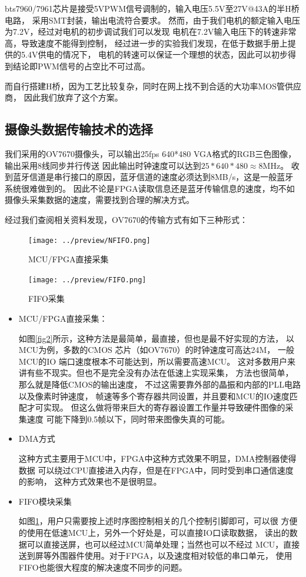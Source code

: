 \documentclass[a4paper]{paper}
\begin{document}
bts7960/7961芯片是接受5VPWM信号调制的，输入电压5.5V至27V@43A的半H桥电路，
采用SMT封装，输出电流符合要求。
然而，由于我们电机的额定输入电压为7.2V，经过对电机的初步调试我们可以发现
电机在7.2V输入电压下的转速非常高，导致速度不能得到控制，
经过进一步的实验我们发现，在低于数据手册上提供的5.4V供电的情况下，
电机的转速可以保证一个理想的状态，因此可以初步得到结论即PWM信号的占空比不可过高。

而自行搭建H桥，因为工艺比较复杂，同时在网上找不到合适的大功率MOS管供应商，
因此我们放弃了这个方案。


\subsection{摄像头数据传输技术的选择}
我们采用的OV7670摄像头，可以输出25fps 640*480 VGA格式的RGB三色图像，输出采用8线同步并行传送
因此输出时钟速度可以达到$25*640*480 \approx 8\mathrm{MHz}$。
收到蓝牙信道是串行接口的原因，蓝牙信道的速度必须达到8MB/s，这是一般蓝牙系统很难做到的。
因此不论是FPGA读取信息还是蓝牙传输信息的速度，均不如摄像头采集数据的速度，需要找到合理的解决方式。

经过我们查阅相关资料发现，OV7670的传输方式有如下三种形式：
\begin{figure}
        \centering
        \texttt{[image: ../preview/NFIFO.png]}
        \caption{MCU/FPGA直接采集}
        \label{fig2}
        \texttt{[image: ../preview/FIFO.png]}
        \caption{FIFO采集}
        \label{fig3}
\end{figure}
\begin{itemize}
    \item MCU/FPGA直接采集：

    如图\ref{fig2}所示，这种方法是最简单，最直接，但也是最不好实现的方法，
    以MCU为例，多数的CMOS 芯片（如OV7670）的时钟速度可高达24M，
    一般MCU的IO 端口速度根本不可能达到，所以需要高速MCU。
    这对多数用户来讲有些不现实。但也不是完全没有办法在低速上实现采集，
    方法也很简单，那么就是降低CMOS的输出速度，
    不过这需要靠外部的晶振和内部的PLL电路以及像素时钟速度，
    帧速等多个寄存器共同设置，并且要和MCU的IO速度匹配才可实现。
    但这么做将带来巨大的寄存器设置工作量并导致硬件图像的采集速度
    可能下降到0.5帧以下，同时带来图像失真的可能。
\end{itemize} 

\begin{itemize}
    \item DMA方式

    这种方式主要用于MCU中，FPGA中这种方式效果不明显，DMA控制器使得数据
    可以绕过CPU直接进入内存，但是在FPGA中，同时受到串口通信速度的影响，
    这种方式效果也不是很明显。

    \item FIFO模块采集

    如图\ref{fig3}，用户只需要按上述时序图控制相关的几个控制引脚即可，可以很
    方便的使用在低速MCU上，另外一个好处是，可以直接IO口读取数据，
    读出的数据可以直接送屏，也可以经过MCU简单处理；当然也可以不经过
    MCU，直接送到屏等外围器件使用。对于FPGA，以及速度相对较低的串口单元，
    使用FIFO也能很大程度的解决速度不同步的问题。

\end{itemize}
\end{document}

